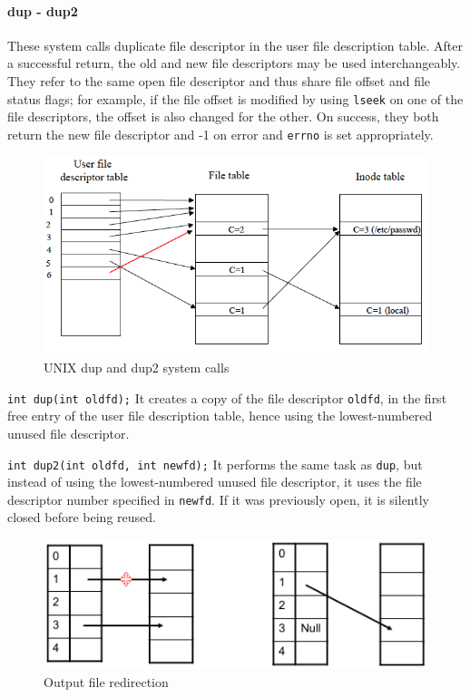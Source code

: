 \paragraph{dup - dup2}
These system calls duplicate file descriptor in the user file description table. After a successful return, the old and new file descriptors may be used interchangeably. They refer to the same open file descriptor and thus share file offset and file status flags; for example, if the file offset is modified by using \texttt{lseek} on one of the file descriptors, the offset is also changed for the other. On success, they both return the new file descriptor and -1 on error and \texttt{errno} is set appropriately.

\begin{figure}[hbtp]
\centering
\includegraphics[scale=0.35]{images/file_system/dup.png}
\caption{UNIX dup and dup2 system calls}
\end{figure}

\texttt{int dup(int oldfd);} It creates a copy of the file descriptor \texttt{oldfd}, in the first free entry of the user file description table, hence using the lowest-numbered unused file descriptor.

\texttt{int dup2(int oldfd, int newfd);} It performs the same task as \texttt{dup}, but instead of using the lowest-numbered unused file descriptor, it uses the file descriptor number specified in \texttt{newfd}. If it was previously open, it is silently closed before being reused.
\medskip

\begin{figure}[hbtp]
\centering
\includegraphics[scale=0.35]{images/file_system/dup_file_redirection.png}
\caption{Output file redirection}
\label{dup_file_redirection}
\end{figure}


